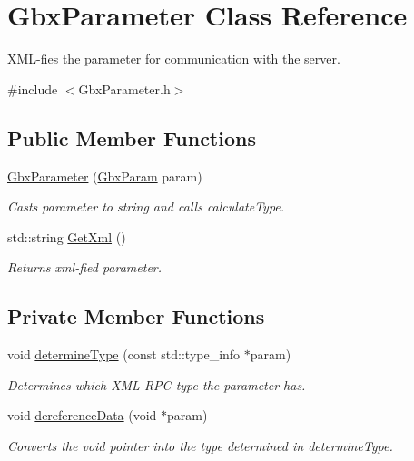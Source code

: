 \hypertarget{classGbxParameter}{\section{Gbx\-Parameter Class Reference}
\label{classGbxParameter}
}


X\-M\-L-\/fies the parameter for communication with the server.  




{\ttfamily \#include $<$Gbx\-Parameter.\-h$>$}

\subsection*{Public Member Functions}
\begin{DoxyCompactItemize}
\item 
\hyperlink{classGbxParameter_a6cfd5c21c176ca6d9d2a1a3d9ad9953c}{Gbx\-Parameter} (\hyperlink{structGbxParam}{Gbx\-Param} param)
\begin{DoxyCompactList}\small\item\em Casts parameter to string and calls calculate\-Type. \end{DoxyCompactList}\item 
\hypertarget{classGbxParameter_a3c6800bca78c5bb4ed7de62cf552ee35}{std\-::string \hyperlink{classGbxParameter_a3c6800bca78c5bb4ed7de62cf552ee35}{Get\-Xml} ()}\label{classGbxParameter_a3c6800bca78c5bb4ed7de62cf552ee35}

\begin{DoxyCompactList}\small\item\em Returns xml-\/fied parameter. \end{DoxyCompactList}\end{DoxyCompactItemize}
\subsection*{Private Member Functions}
\begin{DoxyCompactItemize}
\item 
void \hyperlink{classGbxParameter_af708857623b85684ede2ae002e53a118}{determine\-Type} (const std\-::type\-\_\-info $\ast$param)
\begin{DoxyCompactList}\small\item\em Determines which X\-M\-L-\/\-R\-P\-C type the parameter has. \end{DoxyCompactList}\item 
void \hyperlink{classGbxParameter_a8e038bca99e1eb7339567fe1af79586c}{dereference\-Data} (void $\ast$param)
\begin{DoxyCompactList}\small\item\em Converts the void pointer into the type determined in determine\-Type. \end{DoxyCompactList}\end{DoxyCompactItemize}
